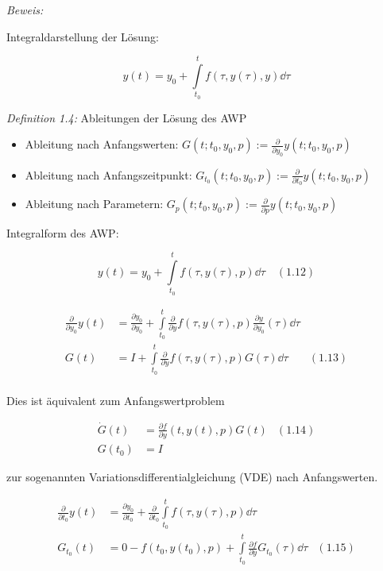 \emph{Beweis:}

Integraldarstellung der Lösung:

\[ y(t) = y_0 + \int\limits_{t_0}^t f(\tau, y(\tau), y) \dd \tau \]

\emph{Definition 1.4:} Ableitungen der Lösung des AWP

\begin{itemize}
\item Ableitung nach Anfangswerten: $G(t; t_0, y_0, p) := \tfrac{\partial}{\partial y_0} y(t; t_0, y_0, p)$
\item Ableitung nach Anfangszeitpunkt: $G_{t_0}(t; t_0, y_0, p) := \frac{\partial}{\partial t_0} y(t; t_0, y_0, p)$
\item Ableitung nach Parametern: $G_p(t; t_0, y_0, p) := \frac{\partial}{\partial p} y(t; t_0, y_0, p)$
\end{itemize}


Integralform des AWP:

\[y(t) = y_0 + \int\limits_{t_0}^t f(\tau, y(\tau), p) \dd \tau \quad (1.12) \]


\begin{align*}
\frac{\partial}{\partial y_0} y(t) &= \frac{\partial y_0}{\partial y_0} + \int\limits_{t_0}^t \frac{\partial}{\partial y} f(\tau, y(\tau), p) \frac{\partial y}{\partial y_0} (\tau) \dd \tau \\
G(t) &= I + \int\limits_{t_0}^t \frac{\partial}{\partial y} f(\tau, y(\tau), p) G(\tau) \dd \tau & (1.13)\\
\end{align*}

Dies ist äquivalent zum Anfangswertproblem

\begin{align*}
\dot G(t) &= \frac{\partial f}{\partial y} (t, y(t), p) G(t) & (1.14)\\
G(t_0) &= I
\end{align*}

zur sogenannten Variationsdifferentialgleichung (VDE) nach Anfangswerten.


\begin{align*}
\frac{\partial}{\partial t_0} y(t) &= \frac{\partial y_0}{\partial t_0} + \frac{\partial}{\partial t_0} \int\limits_{t_0}^t f(\tau, y(\tau),p) \dd \tau \\
G_{t_0} (t) &= 0 - f(t_0, y(t_0), p) + \int\limits_{t_0}^t \frac{\partial f}{\partial y} G_{t_0} (\tau) \dd \tau & (1.15) \\
\end{align*}

